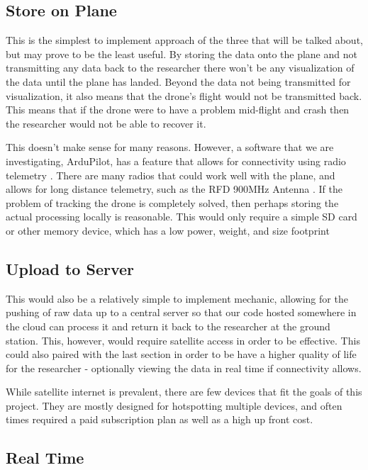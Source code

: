 \documentclass[onecolumn, draftclsnofoot,10pt, compsoc]{IEEEtran}
\begin{document}
\subsection{Store on Plane}

This is the simplest to implement approach of the three that will be talked about, but may prove to be the least useful. By storing the data onto the plane and not transmitting any data back to the researcher there won't be any visualization of the data until the plane has landed. Beyond the data not being transmitted for visualization, it also means that the drone's flight would not be transmitted back. This means that if the drone were to have a problem mid-flight and crash then the researcher would not be able to recover it.

This doesn't make sense for many reasons. However, a software that we are investigating, ArduPilot, has a feature that allows for connectivity using radio telemetry \cite{ConnectArduPilot}. There are many radios that could work well with the plane, and allows for long distance telemetry, such as the RFD 900MHz Antenna \cite{AmazonRadio}. If the problem of tracking the drone is completely solved, then perhaps storing the actual processing locally is reasonable. This would only require a simple SD card or other memory device, which has a low power, weight, and size footprint

\subsection{Upload to Server}

This would also be a relatively simple to implement mechanic, allowing for the pushing of raw data up to a central server so that our code hosted somewhere in the cloud can process it and return it back to the researcher at the ground station. This, however, would require satellite access in order to be effective. This could also paired with the last section in order to be have a higher quality of life for the researcher - optionally viewing the data in real time if connectivity allows.

While satellite internet is prevalent, there are few devices that fit the goals of this project. They are mostly designed for hotspotting multiple devices, and often times required a paid subscription plan as well as a high up front cost\cite{SatelliteDevices}.

\subsection{Real Time}
\end{document}
